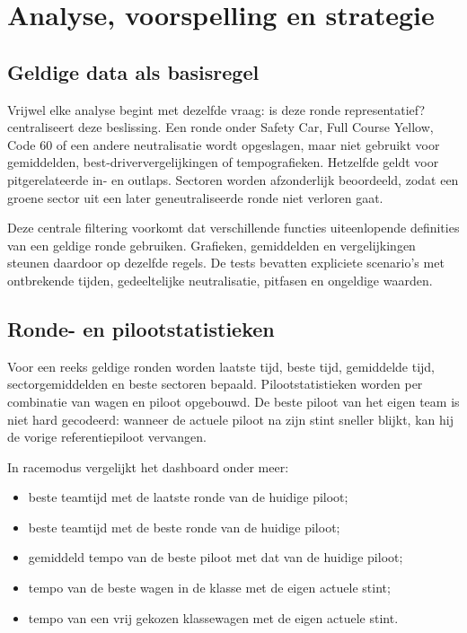 \chapter{Analyse, voorspelling en strategie}
\label{chap:analyse}

\section{Geldige data als basisregel}
Vrijwel elke analyse begint met dezelfde vraag: is deze ronde representatief?  centraliseert deze beslissing. Een ronde onder Safety Car, Full Course Yellow, Code 60 of een andere neutralisatie wordt opgeslagen, maar niet gebruikt voor gemiddelden, best-driververgelijkingen of tempografieken. Hetzelfde geldt voor pitgerelateerde in- en outlaps. Sectoren worden afzonderlijk beoordeeld, zodat een groene sector uit een later geneutraliseerde ronde niet verloren gaat.

Deze centrale filtering voorkomt dat verschillende functies uiteenlopende definities van een geldige ronde gebruiken. Grafieken, gemiddelden en vergelijkingen steunen daardoor op dezelfde regels. De tests bevatten expliciete scenario's met ontbrekende tijden, gedeeltelijke neutralisatie, pitfasen en ongeldige waarden.

\section{Ronde- en pilootstatistieken}
Voor een reeks geldige ronden worden laatste tijd, beste tijd, gemiddelde tijd, sectorgemiddelden en beste sectoren bepaald. Pilootstatistieken worden per combinatie van wagen en piloot opgebouwd. De beste piloot van het eigen team is niet hard gecodeerd: wanneer de actuele piloot na zijn stint sneller blijkt, kan hij de vorige referentiepiloot vervangen.

In racemodus vergelijkt het dashboard onder meer:

\begin{itemize}
  \item beste teamtijd met de laatste ronde van de huidige piloot;
  \item beste teamtijd met de beste ronde van de huidige piloot;
  \item gemiddeld tempo van de beste piloot met dat van de huidige piloot;
  \item tempo van de beste wagen in de klasse met de eigen actuele stint;
  \item tempo van een vrij gekozen klassewagen met de eigen actuele stint.
\end{itemize}

